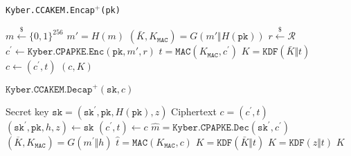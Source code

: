 \documentclass[floatrow,journal=tches,submission]{iacrtrans}
\newcommand{\mac}{\texttt{MAC}}
\newcommand{\pk}{\texttt{pk}}
\newcommand{\sk}{\texttt{sk}}
\newcommand{\leftsample}{\stackrel{\$}{\leftarrow}}
\begin{document}
\begin{algorithm}[H]
    \caption{\texttt{Kyber.CCAKEM.Encap$^+$(\pk)}}\label{alg:kyber-ae-encap}
    \begin{algorithmic}[1]
        \State $m \leftsample \{0,1\}^{256}$
        \State $m'= H(m)$
        \State $(\bar{K}, K_\mac) = G(m' \Vert H(\pk))$
        \State $r \leftsample \mathcal{R}$
        \State $c^\prime  \leftarrow \texttt{Kyber.CPAPKE.Enc}(\pk, m', r)$
            \State $t=\mac(K_\mac, c^\prime)$
        \State $K = \texttt{KDF}(\bar{K} \Vert t)$
        \State $c \leftarrow (c^\prime, t)$
        \State \Return $(c, K)$
    \end{algorithmic}
\end{algorithm}

\begin{algorithm}[H]
    \caption{$\texttt{Kyber.CCAKEM.Decap}^+ (\sk, c)$}\label{alg:kyber-ae-decap}
    \begin{algorithmic}[1]
        \Require Secret key $\sk = (\sk^\prime, \pk, H(\pk), z)$
        \Require Ciphertext $c = (c^\prime, t)$
        \State $(\sk^\prime, \pk, h, z) \leftarrow \sk$
        \State $(c^\prime, t) \leftarrow c$
        \State $\hat{m} = \texttt{Kyber.CPAPKE.Dec}(\sk^\prime, c^\prime)$ 
        \State $(\overline{K}, K_\mac) =   G(m^\prime \Vert h)$
        \State $\hat{t}=\mac(K_\mac, c)$
            \State $K  = \texttt{KDF}(\bar{K} \Vert t)$ 
         \Else 
            \State $K  = \texttt{KDF}(z \Vert t)$ 
        \EndIf
            \State \Return $K$
    \end{algorithmic}
\end{algorithm}
\end{document}
